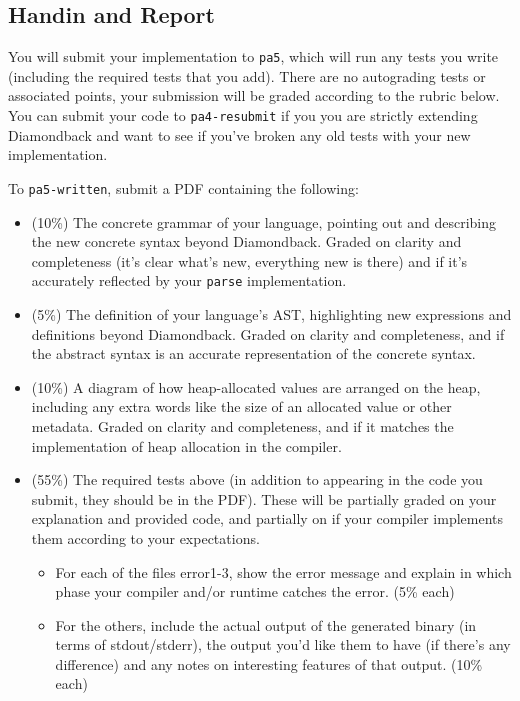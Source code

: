 \documentclass[10pt, oneside]{article}
\begin{document}
\subsection*{Handin and Report}

You will submit your implementation to {\tt pa5}, which will run any tests
you write (including the required tests that you add). There are no
autograding tests or associated points, your submission will be graded
according to the rubric below. You can submit your code to {\tt pa4-resubmit}
if you you are strictly extending Diamondback and want to see if you've
broken any old tests with your new implementation.

To {\tt pa5-written}, submit a PDF containing the following:

\begin{itemize}

\item (10\%) The concrete grammar of your language, pointing out and
describing the new concrete syntax beyond Diamondback. Graded on clarity and
completeness (it's clear what's new, everything new is there) and if it's
accurately reflected by your {\tt parse} implementation.

\item (5\%) The definition of your language's AST, highlighting new
expressions and definitions beyond Diamondback. Graded on clarity and
completeness, and if the abstract syntax is an accurate representation of the
concrete syntax.

\item (10\%) A diagram of how heap-allocated values are arranged on the heap,
including any extra words like the size of an allocated value or other
metadata. Graded on clarity and completeness, and if it matches the
implementation of heap allocation in the compiler.

\item (55\%) The required tests above (in addition to appearing in the code
you submit, they should be in the PDF). These will be partially graded on
your explanation and provided code, and partially on if your compiler
implements them according to your expectations.

  \begin{itemize}

    \item For each of the files error1-3, show the error message and explain
    in which phase your compiler and/or runtime catches the error. (5\% each)

    \item For the others, include the actual output of the generated binary
    (in terms of stdout/stderr), the output you'd like them to have (if
    there's any difference) and any notes on interesting features of that
    output. (10\% each)
  \end{itemize}


\end{itemize}
\end{document}
